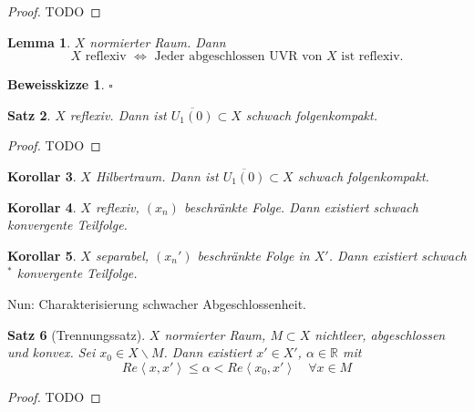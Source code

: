 \documentclass[ngerman]{report}
\theoremstyle{plain}%
\newtheorem{thm}{Satz}[chapter]
\newtheorem{lemma}[thm]{Lemma}
\newtheorem{cor}[thm]{Korollar}
\theoremstyle{definition}%
\theoremstyle{myStyle}
\newtheorem*{proof*}{Beweisskizze}
\newenvironment{hinweise}{\footnotesize \begin{proof*}}{\hfill $\square$ \end{proof*}\normalsize}
\newcommand{\R}{\mathbb{R}}
\newcommand{\aq}{\Leftrightarrow} %
\newcommand{\U}[2][1]{U_{#1}(#2)} %
\newcommand{\EK}{\U{0}} %
\newcommand{\ov}[1]{\overline{#1}}
\newcommand{\fop}[1]{\left \langle #1 \right \rangle} %
\begin{document}

	\begin{proof}
		TODO
	\end{proof}

	\begin{lemma}
		$X$ normierter Raum. Dann 
			$$ X \text{ reflexiv } \aq \text{ Jeder abgeschlossen UVR von } X \text{ ist reflexiv}.$$
	\end{lemma}

	\begin{hinweise}
	\end{hinweise}

	\begin{thm}
		$X$ reflexiv. Dann ist $\ov{\EK} \subset X$ schwach folgenkompakt.
	\end{thm}
	
	\begin{proof}
		TODO	
	\end{proof}

	\begin{cor}
		$X$ Hilbertraum. Dann ist $\ov{\EK} \subset X$ schwach folgenkompakt.
	\end{cor}

	\begin{cor}
		$X$ reflexiv, $(x_n)$ beschränkte Folge. Dann existiert schwach konvergente Teilfolge.
	\end{cor}

	\begin{cor}
		$X$ separabel, $(x_n')$ beschränkte Folge in $X'$. Dann existiert schwach$^*$ konvergente Teilfolge.
	\end{cor}

	Nun: Charakterisierung schwacher Abgeschlossenheit.
	
	\begin{thm}[Trennungssatz]
		$X$ normierter Raum, $M \subset X$ nichtleer, abgeschlossen und konvex. Sei $x_0 \in X\backslash M$. Dann existiert $x' \in X'$, $\alpha\in \R$ mit
			$$Re\fop{x,x'} \leq \alpha < Re\fop{x_0, x'} \quad \forall x\in M$$
	\end{thm}
	\begin{proof}
		TODO	
	\end{proof}
\end{document}

